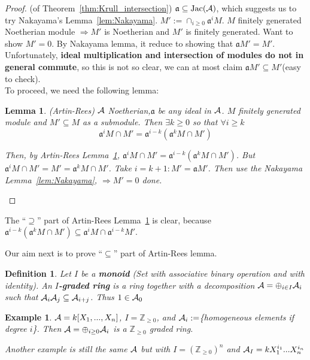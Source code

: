 \documentclass[11pt]{article}
\newtheorem{lemma}[thm]{Lemma}
\newtheorem{dfn}[thm]{Definition}
\newtheorem{ex}[thm]{Example}
\newcommand{\intg}{\mathbb Z}
\newcommand{\sca}{{\mathfrak a}}
\newcommand{\cala}{{\cal A}}
\newcommand{\Lrta}{\Longrightarrow}
\begin{document}
\begin{proof}(of Theorem~\ref{thm:Krull_intersection})
$\sca\subseteq \text{Jac}(\cala)$, which suggests us to  try Nakayama's Lemma~\ref{lem:Nakayama}.
$M':=\cap_{i\geq 0}\sca^i M.$ $M$ finitely generated Noetherian module $\Lrta M'$ is Noetherian and $M'$ is finitely generated. Want to show $M'=0$. By Nakayama lemma, it reduce to showing that $\sca M'=M'$.\\
Unfortunately, \textbf{ideal multiplication and intersection of modules do not in general commute}, so this is not so clear, we can at most claim $\sca M'\subseteq M'$(easy to check).\\ 
To proceed, we need the following lemma:
\begin{lemma}\label{lem:Artin-Rees}
(Artin-Rees) $\cala$ Noetherian,$\sca$ be any ideal in $\cala$. $M$ finitely generated module and $M'\subseteq M$ as a submodule. Then $\exists k\geq 0 $ so that $\forall i\geq k$
$$
\sca^i M\cap M'=\sca^{i-k}(\sca^k M\cap M')
$$

Then, by Artin-Rees Lemma~\ref{lem:Artin-Rees}, $\sca^i M\cap M'=\sca^{i-k}(\sca^k M\cap M')$. But $\sca^i M\cap M'=M'=\sca^k M\cap M'$. Take $i=k+1: M'=\sca M'$. Then use the Nakayama Lemma~\ref{lem:Nakayama}, $\Lrta M'=0$   done.
\end{lemma}
\end{proof}

The ``$\supseteq$'' part of Artin-Rees Lemma~\ref{lem:Artin-Rees} is clear, because $\sca^{i-k}(\sca^k M\cap M')\subseteq \sca^i M\cap\sca^{i-k}M'$.

Our aim next is to prove ``$\subseteq $'' part of Artin-Rees lemma.
\begin{dfn}
Let $I$ be a \textbf{monoid} (Set with associative binary operation and with identity). An \textbf{$I$-graded ring} is a ring together with a decomposition $\cala=\oplus_{i\in I}\cala_i$ such that $\cala_i\cala_j\subseteq \cala_{i+j}$. Thus $1\in \cala_0$
\end{dfn}

\begin{ex}
$\cala=k[X_1,...,X_n]$, $I=\intg_{\geq 0}$, and $\cala_i:=$\{homogeneous elements if degree $i$\}. Then $\cala=\oplus_{i\geq 0}\cala_i$ is a $\intg_{\geq 0}$ graded ring.

Another example is still the same $\cala$ but with $I=(\intg_{\geq 0})^n$ and $\cala_I=k X_1^{i_1}...X_n^{i_n}$
\end{ex}
\end{document}

